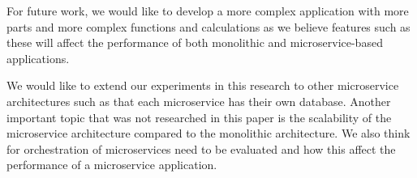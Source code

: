 \documentclass[a4paper,oneside]{bth}
\begin{document}
\par\vspace{0.5cm}
For future work, we would like to develop a more complex application with more parts and more complex functions and calculations as we believe features such as these will affect the performance of both monolithic and microservice-based applications.

\par\vspace{0.5cm}
We would like to extend our experiments in this research to other microservice architectures such as that each microservice has their own database. Another important topic that was not researched in this paper is the scalability of the microservice architecture compared to the monolithic architecture. We also think for orchestration of microservices need to be evaluated and how this affect the performance of a microservice application.

{}

\end{document}
